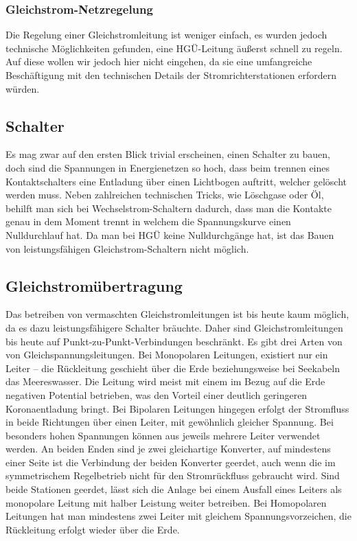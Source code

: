 \subsubsection{Gleichstrom-Netzregelung}
Die Regelung einer Gleichstromleitung ist weniger einfach, es wurden jedoch technische Möglichkeiten gefunden, eine HGÜ-Leitung äußerst schnell zu regeln. Auf diese wollen wir jedoch hier nicht eingehen, da sie eine umfangreiche Beschäftigung mit den technischen Details der Stromrichterstationen erfordern würden. %

\subsection{Schalter}
Es mag zwar auf den ersten Blick trivial erscheinen, einen Schalter zu bauen, doch sind die Spannungen in Energienetzen so hoch, dass beim trennen eines Kontaktschalters eine Entladung über einen Lichtbogen auftritt, welcher gelöscht werden muss.
Neben zahlreichen technischen Tricks, wie Löschgase oder Öl, behilft man sich bei Wechselstrom-Schaltern dadurch,
dass man die Kontakte genau in dem Moment trennt in welchem die Spannungskurve einen Nulldurchlauf hat. %
Da man bei HGÜ keine Nulldurchgänge hat, ist das Bauen von leistungsfähigen Gleichstrom-Schaltern nicht möglich. %

\subsection{Gleichstromübertragung}
Das betreiben von vermaschten Gleichstromleitungen ist bis heute kaum möglich, da es dazu leistungsfähigere Schalter bräuchte.\cite{Schymroch}
Daher sind Gleichstromleitungen bis heute auf Punkt-zu-Punkt-Verbindungen beschränkt.
Es gibt drei Arten von von Gleichspannungsleitungen.
Bei Monopolaren Leitungen, existiert nur ein Leiter – die Rückleitung geschieht über die Erde beziehungsweise bei Seekabeln das Meereswasser. Die Leitung wird meist mit einem im Bezug auf die Erde negativen Potential betrieben, was den Vorteil einer deutlich geringeren Koronaentladung bringt.\cite{Padiyar}
Bei Bipolaren Leitungen hingegen erfolgt der Stromfluss in beide Richtungen über einen Leiter, mit gewöhnlich gleicher Spannung. Bei besonders hohen Spannungen können aus jeweils mehrere Leiter verwendet werden. An beiden Enden sind je zwei gleichartige Konverter, auf mindestens einer Seite ist die Verbindung der beiden Konverter geerdet, auch wenn die im symmetrischem Regelbetrieb nicht für den Stromrückfluss gebraucht wird. Sind beide Stationen geerdet, lässt sich die Anlage bei einem Ausfall eines Leiters als monopolare Leitung mit halber Leistung weiter betreiben.
Bei Homopolaren Leitungen hat man mindestens zwei Leiter mit gleichem Spannungsvorzeichen, die Rückleitung erfolgt wieder über die Erde.

